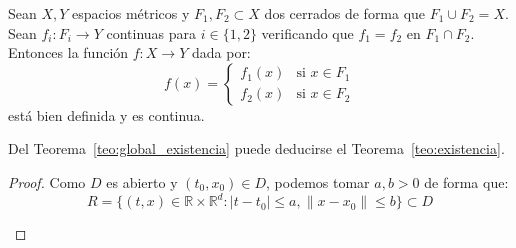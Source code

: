 \begin{lema}\label{lema:del_pegado}
    Sean $X,Y$ espacios métricos y $F_1,F_2\subset X$ dos cerrados de forma que $F_1\cup F_2 = X$. Sean $f_i:F_i\to Y$ continuas para $i \in \{1,2\}$ verificando que $f_1 = f_2$ en $F_1\cap F_2$. Entonces la función $f:X\to Y$ dada por:
    \begin{equation*}
        f(x) = \left\{\begin{array}{ll}
            f_1(x) & \text{si\ } x\in F_1 \\
            f_2(x) & \text{si\ } x\in F_2
        \end{array}\right. 
    \end{equation*}
    está bien definida y es continua.
\end{lema}

\begin{prop}
    Del Teorema~\ref{teo:global_existencia} puede deducirse el Teorema~\ref{teo:existencia}.
    \begin{proof} 
        Como $D$ es abierto y $(t_0,x_0)\in D$, podemos tomar $a,b>0$ de forma que:
        \begin{equation*}
            R = \{(t,x)\in \mathbb{R}\times\mathbb{R}^d : |t-t_0|\leq a, \|x-x_0\|\leq b\} \subset D
        \end{equation*} 
        \begin{figure}[H]
            \centering
\end{figure}
\end{proof}
\end{prop}
